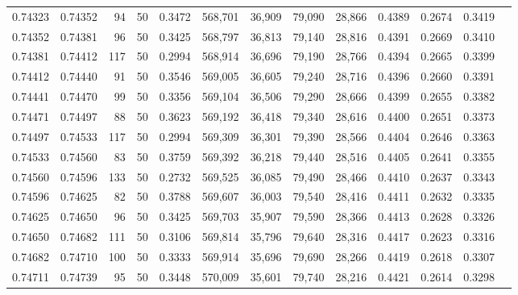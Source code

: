 \begin{tabular}{rrrrrrrrrrrrr}
0.74323 & 0.74352 &    94 &  50 &                                     0.3472 & 568,701 &  36,909 &  79,090 &  28,866 & 0.4389 & 0.2674 & 0.3419 \\
0.74352 & 0.74381 &    96 &  50 &                                     0.3425 & 568,797 &  36,813 &  79,140 &  28,816 & 0.4391 & 0.2669 & 0.3410 \\
0.74381 & 0.74412 &   117 &  50 &                                     0.2994 & 568,914 &  36,696 &  79,190 &  28,766 & 0.4394 & 0.2665 & 0.3399 \\
0.74412 & 0.74440 &    91 &  50 &                                     0.3546 & 569,005 &  36,605 &  79,240 &  28,716 & 0.4396 & 0.2660 & 0.3391 \\
0.74441 & 0.74470 &    99 &  50 &                                     0.3356 & 569,104 &  36,506 &  79,290 &  28,666 & 0.4399 & 0.2655 & 0.3382 \\
0.74471 & 0.74497 &    88 &  50 &                                     0.3623 & 569,192 &  36,418 &  79,340 &  28,616 & 0.4400 & 0.2651 & 0.3373 \\
0.74497 & 0.74533 &   117 &  50 &                                     0.2994 & 569,309 &  36,301 &  79,390 &  28,566 & 0.4404 & 0.2646 & 0.3363 \\
0.74533 & 0.74560 &    83 &  50 &                                     0.3759 & 569,392 &  36,218 &  79,440 &  28,516 & 0.4405 & 0.2641 & 0.3355 \\
0.74560 & 0.74596 &   133 &  50 &                                     0.2732 & 569,525 &  36,085 &  79,490 &  28,466 & 0.4410 & 0.2637 & 0.3343 \\
0.74596 & 0.74625 &    82 &  50 &                                     0.3788 & 569,607 &  36,003 &  79,540 &  28,416 & 0.4411 & 0.2632 & 0.3335 \\
0.74625 & 0.74650 &    96 &  50 &                                     0.3425 & 569,703 &  35,907 &  79,590 &  28,366 & 0.4413 & 0.2628 & 0.3326 \\
0.74650 & 0.74682 &   111 &  50 &                                     0.3106 & 569,814 &  35,796 &  79,640 &  28,316 & 0.4417 & 0.2623 & 0.3316 \\
0.74682 & 0.74710 &   100 &  50 &                                     0.3333 & 569,914 &  35,696 &  79,690 &  28,266 & 0.4419 & 0.2618 & 0.3307 \\
0.74711 & 0.74739 &    95 &  50 &                                     0.3448 & 570,009 &  35,601 &  79,740 &  28,216 & 0.4421 & 0.2614 & 0.3298 \\

\end{tabular}
